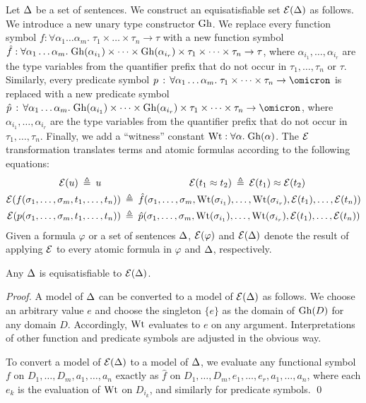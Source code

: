 
Let $\mathrm{\Delta}$ be a set of sentences.
We construct an equisatisfiable set $\mathcal{E}(\mathrm{\Delta})$ as follows.
%
We introduce a new unary type constructor $\mathrm{Gh}$.
We replace every function symbol $f : \forall \alpha_1\dots\alpha_m .\; \tau_1 \times \dots \times \tau_n \to \tau$
with a new function symbol $\hat{f} : \forall \alpha_1\dots\alpha_m .\;
\mathrm{Gh}(\alpha_{i_1}) \times \dots \times \mathrm{Gh}(\alpha_{i_r}) \times
\tau_1 \times \dots \times \tau_n \to \tau$,
where $\alpha_{i_1},\dots,\alpha_{i_r}$ are the type
variables from the quantifier prefix that do not occur in
$\tau_1,\dots,\tau_n$ or $\tau$.
Similarly, every predicate symbol $p \,\ty\,
\forall \alpha_1\dots\alpha_m .\;\allowbreak \tau_1 \times \dots \times \tau_n \to \omicron$
is replaced with a new predicate symbol $\hat{p} \,\ty\,
\forall \alpha_1\dots\alpha_m .\;\allowbreak
\ghost(\alpha_{i_1}) \times \dots \times \ghost(\alpha_{i_r}) \times
\tau_1 \times \dots \times \tau_n \to \omicron$,
where $\alpha_{i_1},\dots,\alpha_{i_r}$ are the type
variables from the quantifier prefix that do not occur in
$\tau_1,\dots,\tau_n$.
Finally, we add a ``witness'' constant $\mathrm{Wt} : \forall \alpha.\;\mathrm{Gh}(\alpha)$.
The $\mathcal{E}$ transformation translates terms and atomic
formulas according to the following equations:
\begin{align*}
\mathcal{E}(u) \:\triangleq\: u
\quad\quad & \qquad\qquad\qquad\quad
\mathcal{E}(t_1 \approx t_2) \:\triangleq\: \mathcal{E}(t_1) \approx \mathcal{E}(t_2) \\
\mathcal{E}(f(\sigma_1,\dots,\sigma_m,t_1,\dots,t_n)) &\:\triangleq\:
\hat{f}(\sigma_1,\dots,\sigma_m,\mathrm{Wt}(\sigma_{i_1}),\dots,\mathrm{Wt}(\sigma_{i_r}),
\mathcal{E}(t_1),\dots,\mathcal{E}(t_n)) \\
\mathcal{E}(p(\sigma_1,\dots,\sigma_m,t_1,\dots,t_n)) &\:\triangleq\:
\hat{p}(\sigma_1,\dots,\sigma_m,\mathrm{Wt}(\sigma_{i_1}),\dots,\mathrm{Wt}(\sigma_{i_r}),
\mathcal{E}(t_1),\dots,\mathcal{E}(t_n))
\end{align*}
Given a formula $\varphi$ or a set of sentences $\mathrm{\Delta}$,
$\mathcal{E}(\varphi)$ and $\mathcal{E}(\mathrm{\Delta})$ denote the result of
applying $\mathcal{E}$ to every atomic formula in $\varphi$ and
$\mathrm{\Delta}$, respectively.

\begin{theorem} \label{thm:eli}
Any $\mathrm{\Delta}$ is equisatisfiable to $\mathcal{E}(\mathrm{\Delta})$.
\end{theorem}
\begin{proof}
A model of $\mathrm{\Delta}$ can be converted to a model of $\mathcal{E}(\mathrm{\Delta})$
as follows. We choose an arbitrary value $e$ and choose the singleton
$\{ e \}$ as the domain of $\mathrm{Gh}(D)$ for any domain $D$.
Accordingly, $\mathrm{Wt}$ evaluates to $e$ on any argument.
Interpretations of other function and predicate symbols are
adjusted in the obvious way.

To convert a model of $\mathcal{E}(\mathrm{\Delta})$
to a model of $\mathrm{\Delta}$, we evaluate any functional symbol
$f$ on $D_1,\dots,D_m,a_1,\dots,a_n$ exactly as
$\hat{f}$ on $D_1,\dots,D_m,e_1,\dots,e_r,a_1,\dots,a_n$,
where each $e_k$ is the evaluation of $\mathrm{Wt}$ on $D_{i_k}$, and similarly
for predicate symbols.
\qed
\end{proof}

